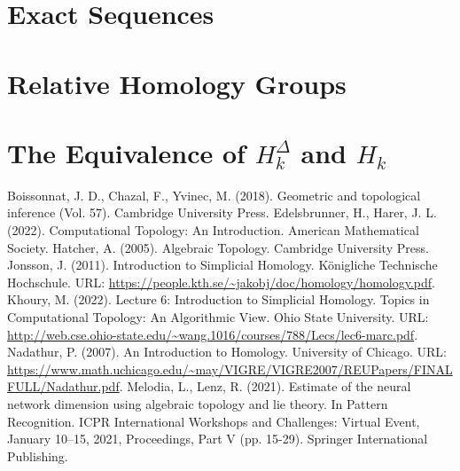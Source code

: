 \documentclass{article}
\begin{document}
\section{Exact Sequences}
\section{Relative Homology Groups}
\section{The Equivalence of $H_k^\Delta$ and $H_k$}

\begin{thebibliography}{100}
 Boissonnat, J. D., Chazal, F., Yvinec, M. (2018). Geometric and topological inference (Vol. 57). Cambridge University Press.
 Edelsbrunner, H., Harer, J. L. (2022). Computational Topology: An Introduction. American Mathematical Society.
 Hatcher, A. (2005). Algebraic Topology. Cambridge University Press.
 Jonsson, J. (2011). Introduction to Simplicial Homology. Königliche Technische Hochschule. URL: \url{https://people.kth.se/~jakobj/doc/homology/homology.pdf}.
 Khoury, M. (2022). Lecture 6: Introduction to Simplicial Homology. Topics in Computational Topology: An Algorithmic View. Ohio State University. URL: \url{http://web.cse.ohio-state.edu/~wang.1016/courses/788/Lecs/lec6-marc.pdf}.
 Nadathur, P. (2007). An Introduction to Homology. University of Chicago. URL: \url{https://www.math.uchicago.edu/~may/VIGRE/VIGRE2007/REUPapers/FINALFULL/Nadathur.pdf}.
 Melodia, L., Lenz, R. (2021). Estimate of the neural network dimension using algebraic topology and lie theory. In Pattern Recognition. ICPR International Workshops and Challenges: Virtual Event, January 10–15, 2021, Proceedings, Part V (pp. 15-29). Springer International Publishing.
\end{thebibliography}
\end{document}
